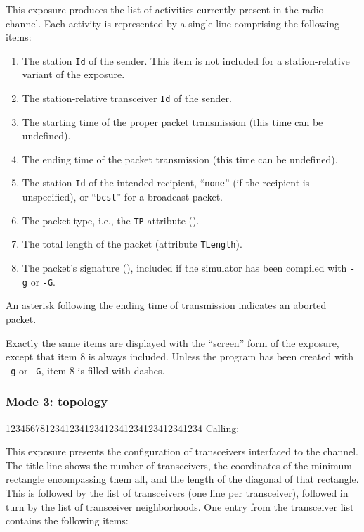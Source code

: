This exposure produces the list of activities currently present in the
radio channel.
Each activity is represented by a single line comprising the following
items:

\begin{enumerate}
\item
The station {\tt Id} of the sender.
This item is not included for a station-relative variant of the exposure.
\item
The station-relative transceiver {\tt Id} of the sender.
\item
The starting time of the proper packet transmission (this time can be
undefined).
\item
The ending time of the packet transmission (this time can be undefined).
\item
The station {\tt Id} of the intended recipient, ``{\tt none}'' (if the recipient
is unspecified), or ``{\tt bcst}'' for a broadcast packet.
\item
The packet type, i.e., the {\tt TP} attribute ().
\item
The total length of the packet (attribute {\tt TLength}).
\item
The packet's signature (), included if the simulator
has been compiled with {\tt -g} or {\tt -G}.
\end{enumerate}

An asterisk following the ending time of transmission indicates an aborted
packet.

Exactly the same items are displayed with the ``screen''
form of the exposure, except that item 8 is always included.
Unless the program has been created with {\tt -g} or {\tt -G}, item 8 is filled
with dashes.

\subsubsection*{Mode 3: topology}

{\tt\begin{tabbing}
12345678\=1234\=1234\=1234\=1234\=1234\=1234\=1234\=1234\kill
{\rm Calling:}
\end{tabbing}}

This exposure presents the configuration of transceivers
interfaced to the channel.
The title line shows the number of transceivers, the coordinates of the
minimum rectangle encompassing them all, and the length of the
diagonal of that rectangle.
This is followed by the list of transceivers (one line per transceiver),
followed in turn by the list of transceiver neighborhoods.
One entry from the transceiver list contains the following items:

